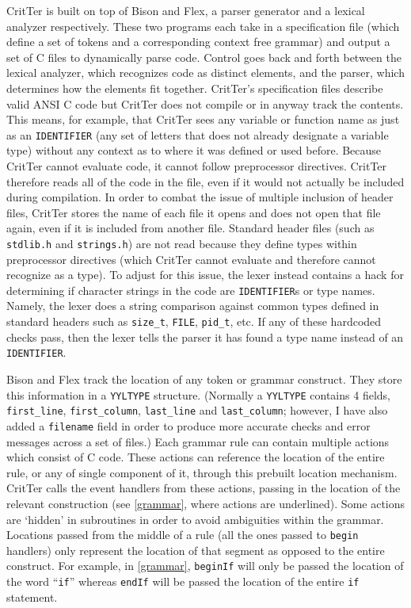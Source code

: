 \documentclass[12pt]{report}
\newcommand{\programName}{CritTer\xspace}
\begin{document}
\programName is built on top of Bison and Flex, a parser generator and a lexical analyzer 
respectively. These two programs each take in a specification file (which define a set of tokens and a 
corresponding context free grammar) and output a set of C files to dynamically parse code. 
Control goes back and forth between the lexical analyzer, which recognizes code as distinct elements, 
and the parser, which determines how the elements fit together. \programName's specification files 
describe valid ANSI C code but \programName does not compile or in anyway track the contents. This 
means, for example, that \programName sees any variable or function name as just as an 
\lstinline{IDENTIFIER} (any set of letters that does not already designate a variable  type) without any 
context as to where it was defined or used before. Because \programName cannot evaluate code, it 
cannot follow preprocessor directives. \programName therefore reads all of the code in the file, even if 
it would not actually be included during compilation. In order to combat the issue of multiple inclusion 
of header files, \programName stores the name of each file it opens and does not open that file again, 
even if it is included from another file. Standard header files (such as \lstinline{stdlib.h} and 
\lstinline{strings.h}) are not read because they define types within preprocessor directives (which 
\programName cannot evaluate and therefore cannot recognize as a type). To adjust for this issue, the 
lexer instead contains a hack for determining if character strings in the code are \lstinline{IDENTIFIER}s 
or type names. Namely, the lexer does a string comparison against common types defined in standard 
headers such as \lstinline{size_t}, \lstinline{FILE}, \lstinline{pid_t}, etc. If any of these hardcoded checks 
pass, then the lexer tells the parser it has found a type name instead of an \lstinline{IDENTIFIER}.

Bison and Flex track the location of any token or grammar construct. They store 
this information in a \lstinline{YYLTYPE} structure. (Normally a \lstinline{YYLTYPE} contains 4 fields, 
\lstinline{first_line}, \lstinline{first_column}, \lstinline{last_line} and \lstinline{last_column}; however, I 
have also added a \lstinline{filename} field in order to produce more accurate checks and error 
messages across a set of files.) Each grammar rule can contain multiple actions which consist of C code. 
These actions can reference the location of the entire rule, or any of single component of it, through this 
prebuilt location mechanism. \programName calls the event handlers from these actions, passing in 
the location of the relevant construction (see \autoref{grammar}, where actions are underlined). 
Some actions are `hidden' in subroutines in order to avoid ambiguities within the grammar. Locations 
passed from the middle of a rule (all the ones passed to \lstinline{begin} handlers) only represent the 
location of that segment as opposed to the entire construct. For example, in \autoref{grammar}, 
\lstinline{beginIf} will only be passed the location of the word ``\lstinline{if}'' whereas 
\lstinline{endIf} will be passed the location of the entire \lstinline{if} statement.
\end{document}
